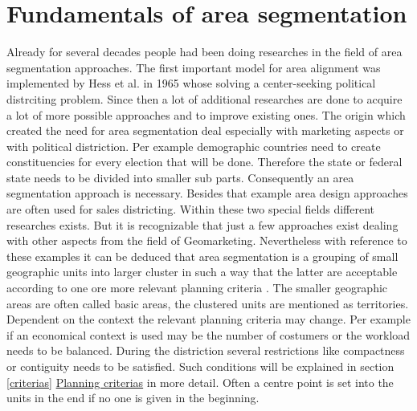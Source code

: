 \section{Fundamentals of area segmentation}

Already for several decades people had been doing researches in the field of area segmentation approaches. The first important model for area alignment was implemented by Hess et al. in 1965 whose solving a center-seeking political distrciting problem\cite{hess}. Since then a lot of additional researches are done to acquire a lot of more possible approaches and to improve existing ones. The origin which created the need for area segmentation deal especially with marketing aspects or with political distriction. Per example demographic countries need to create constituencies for every election that will be done. Therefore the state or federal state needs to be divided into smaller sub parts. Consequently an area segmentation approach is necessary. Besides that example area design approaches are often used for sales districting. Within these two special fields different researches exists. But it is recognizable that just a few approaches exist dealing with other aspects from the field of Geomarketing. Nevertheless with reference to these examples it can be deduced that area segmentation is a grouping of small geographic units into larger cluster in such a way that the latter are acceptable according to one ore more relevant planning criteria \cite{kalcsics, zoltner}. The smaller geographic areas are often called basic areas, the clustered units are mentioned as territories. Dependent on the context the relevant planning criteria may change. Per example if an economical context is used may be the number of costumers or the workload needs to be balanced. During the distriction several restrictions like compactness or contiguity needs to be satisfied. Such conditions will be explained in section \ref{criterias} \hyperref[criterias]{Planning criterias} in more detail. Often a centre point is set into the units in the end if no one is given in the beginning.\\

